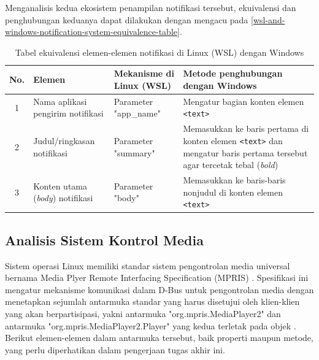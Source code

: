 Menganalisis kedua ekosistem penampilan notifikasi tersebut, ekuivalensi dan penghubungan keduanya dapat dilakukan dengan mengacu pada \autoref{wsl-and-windows-notification-system-equivalence-table}.

\begin{table}[h]
    \centering
    \caption{Tabel ekuivalensi elemen-elemen notifikasi di Linux (WSL) dengan Windows}
    \label{wsl-and-windows-notification-system-equivalence-table}
    \begin{tabularx}{\textwidth}{|c|p{3cm}|X|X|} \hline
        \textbf{No.} & \textbf{Elemen} & \textbf{Mekanisme di Linux (WSL)} & \textbf{Metode penghubungan dengan Windows}\\ \hline
        1 & Nama aplikasi pengirim notifikasi & Parameter "app\_name" & Mengatur bagian konten elemen \verb|<text>|\\ \hline
        2 & Judul/ringkasan notifikasi & Parameter "summary" & Memasukkan ke baris pertama di konten elemen \verb|<text>| dan mengatur baris pertama tersebut agar tercetak tebal (\textit{bold})\\ \hline
        3 & Konten utama (\textit{body}) notifikasi & Parameter "body" & Memasukkan ke baris-baris nonjudul di konten elemen \verb|<text>|\\ \hline
    \end{tabularx}
\end{table}

\subsection{Analisis Sistem Kontrol Media}

Sistem operasi Linux memiliki standar sistem pengontrolan media universal bernama Media Plyer Remote Interfacing Specification (MPRIS) \cite{xdg-mpris-specification}. Spesifikasi ini mengatur mekanisme komunikasi dalam D-Bus untuk pengontrolan media dengan menetapkan sejumlah antarmuka standar yang harus disetujui oleh klien-klien yang akan berpartisipasi, yakni antarmuka "org.mpris.MediaPlayer2" dan antarmuka "org.mpris.MediaPlayer2.Player" yang kedua terletak pada objek . Berikut elemen-elemen dalam antarmuka tersebut, baik properti maupun metode, yang perlu diperhatikan dalam pengerjaan tugas akhir ini.

